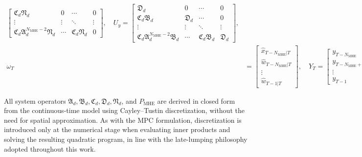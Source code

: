\begin{equation}
\begin{aligned}
\begin{bmatrix}
        \mathfrak{C}_d \mathfrak{N}_d & 0 & \cdots & 0 \\
        \vdots & \vdots & \ddots & \vdots \\
        \mathfrak{C}_d \mathfrak{A}_d^{{N_{\mathrm{MHE}}}-2} \mathfrak{N}_d & \cdots & \mathfrak{C}_d \mathfrak{N}_d & 0
        \end{bmatrix}, \quad
        U_y =
        \begin{bmatrix}
        \mathfrak{D}_d & 0 & \cdots & 0 \\
        \mathfrak{C}_d \mathfrak{B}_d & \mathfrak{D}_d & \cdots & 0 \\
        \vdots & \vdots & \ddots & \vdots \\
        \mathfrak{C}_d \mathfrak{A}_d^{{N_{\mathrm{MHE}}}-2} \mathfrak{B}_d & \cdots & \mathfrak{C}_d \mathfrak{B}_d & \mathfrak{D}_d
        \end{bmatrix}, \\[1ex]
        \omega_T &=
        \left[
        \begin{array}{c}
        \hat{x}_{T-N_{\mathrm{MHE}}|T} \\
        \hline
        \hat{w}_{T-N_{\mathrm{MHE}}|T} \\
        \vdots \\
        \hat{w}_{T-1|T}
        \end{array}
        \right], \quad
        Y_T =
        \begin{bmatrix}
        y_{T-{N_{\mathrm{MHE}}}} \\
        y_{T-{N_{\mathrm{MHE}}}+1} \\
        \vdots \\
        y_{T-1}
        \end{bmatrix} \quad 
        U_T =
        \begin{bmatrix}
        u_{T-{N_{\mathrm{MHE}}}} \\
        u_{T-{N_{\mathrm{MHE}}}+1} \\
        \vdots \\
        u_{T-1}
        \end{bmatrix}
    \end{aligned}
\end{equation}


All system operators $\mathfrak{A}_d, \mathfrak{B}_d, \mathfrak{C}_d, \mathfrak{D}_d, \mathfrak{N}_d$, and $P_{\mathrm{MHE}}$ are derived in closed form from the continuous-time model using Cayley--Tustin discretization, without the need for spatial approximation. As with the MPC formulation, discretization is introduced only at the numerical stage when evaluating inner products and solving the resulting quadratic program, in line with the late-lumping philosophy adopted throughout this work.

